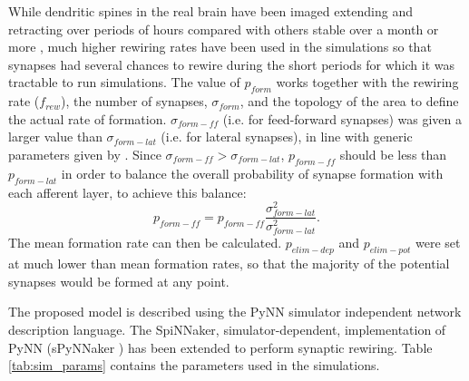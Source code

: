 \documentclass{article}
\begin{document}
While dendritic spines in the real brain have been imaged extending and retracting over periods of hours compared with others stable over a month or more \cite{Grutzendler2002}, 
much higher rewiring rates have been used in the simulations so that synapses had several chances to rewire during the short periods for which it was tractable to run simulations.
The value of $p_{form}$ works together with the rewiring rate ($f_{rew}$), the number of synapses, $\sigma_{form}$, and the topology of the area to define the actual rate of formation.
$\sigma_{form-ff}$ (i.e. for feed-forward synapses) was given a larger value than $\sigma_{form-lat}$ (i.e. for lateral synapses), in line with generic parameters given by \cite{miikkulainen2006computational}.
Since $\sigma_{form-ff} > \sigma_{form-lat}$, $p_{form-ff}$ should be less than $p_{form-lat}$ in order to balance the overall probability of synapse formation with each afferent layer, to achieve this balance:
\begin{equation}
    p_{form-ff} = p_{form-ff} \frac{\sigma^2_{form-lat}}{\sigma^2_{form-lat}}.
\end{equation}
The mean formation rate can then be calculated. 
$p_{elim-dep}$ and $p_{elim-pot}$ were set at much lower than mean formation rates, so that the majority of the potential synapses would be formed at any point.

The proposed model is described using the PyNN \cite{davison2009pynn} simulator independent network description language. 
The SpiNNaker, simulator-dependent, implementation of PyNN (sPyNNaker \cite{rhodes2018spynnaker}) has been extended to perform synaptic rewiring. 
Table \ref{tab:sim_params} contains the parameters used in the simulations.
\end{document}
